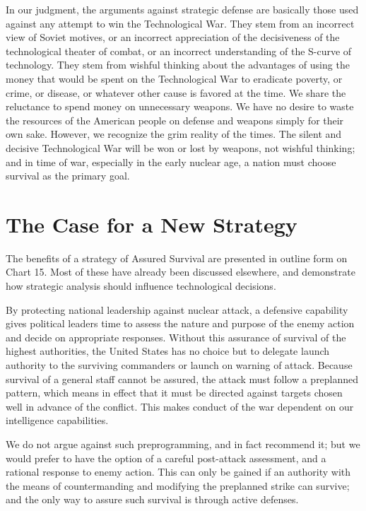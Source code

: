 In our judgment, the arguments against strategic defense are basically those used against any attempt to win the Technological War. They stem from an incorrect view of Soviet motives, or an incorrect appreciation of the decisiveness of the technological theater of combat, or an incorrect understanding of the S-curve of technology. They stem from wishful thinking about the advantages of using the money that would be spent on the Technological War to eradicate poverty, or crime, or disease, or whatever other cause is favored at the time. We share the reluctance to spend money on unnecessary weapons. We have no desire to waste the resources of the American people on defense and weapons simply for their own sake. However, we recognize the grim reality of the times. The silent and decisive Technological War will be won or lost by weapons, not wishful thinking; and in time of war, especially in the early nuclear age, a nation must choose survival as the primary goal.

\section{The Case for a New Strategy}
The benefits of a strategy of Assured Survival are presented in outline form on Chart 15. Most of these have already been discussed elsewhere, and demonstrate how strategic analysis should influence technological decisions.

By protecting national leadership against nuclear attack, a defensive capability gives political leaders time to assess the nature and purpose of the enemy action and decide on appropriate responses. Without this assurance of survival of the highest authorities, the United States has no choice but to delegate launch authority to the surviving commanders or launch on warning of attack. Because survival of a general staff cannot be assured, the attack must follow a preplanned pattern, which means in effect that it must be directed against targets chosen well in advance of the conflict. This makes conduct of the war dependent on our intelligence capabilities.

We do not argue against such preprogramming, and in fact recommend it; but we would prefer to have the option of a careful post-attack assessment, and a rational response to enemy action. This can only be gained if an authority with the means of countermanding and modifying the preplanned strike can survive; and the only way to assure such survival is through active defenses.

